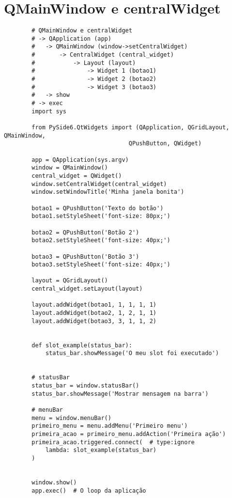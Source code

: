 \documentclass[12pt,a4paper]{article}
\begin{document}
    \section{QMainWindow e centralWidget}
    \begin{lstlisting}
        # QMainWindow e centralWidget
        # -> QApplication (app)
        #   -> QMainWindow (window->setCentralWidget)
        #       -> CentralWidget (central_widget)
        #           -> Layout (layout)
        #               -> Widget 1 (botao1)
        #               -> Widget 2 (botao2)
        #               -> Widget 3 (botao3)
        #   -> show
        # -> exec
        import sys

        from PySide6.QtWidgets import (QApplication, QGridLayout, QMainWindow,
                                    QPushButton, QWidget)

        app = QApplication(sys.argv)
        window = QMainWindow()
        central_widget = QWidget()
        window.setCentralWidget(central_widget)
        window.setWindowTitle('Minha janela bonita')

        botao1 = QPushButton('Texto do botão')
        botao1.setStyleSheet('font-size: 80px;')

        botao2 = QPushButton('Botão 2')
        botao2.setStyleSheet('font-size: 40px;')

        botao3 = QPushButton('Botão 3')
        botao3.setStyleSheet('font-size: 40px;')

        layout = QGridLayout()
        central_widget.setLayout(layout)

        layout.addWidget(botao1, 1, 1, 1, 1)
        layout.addWidget(botao2, 1, 2, 1, 1)
        layout.addWidget(botao3, 3, 1, 1, 2)


        def slot_example(status_bar):
            status_bar.showMessage('O meu slot foi executado')


        # statusBar
        status_bar = window.statusBar()
        status_bar.showMessage('Mostrar mensagem na barra')

        # menuBar
        menu = window.menuBar()
        primeiro_menu = menu.addMenu('Primeiro menu')
        primeira_acao = primeiro_menu.addAction('Primeira ação')
        primeira_acao.triggered.connect(  # type:ignore
            lambda: slot_example(status_bar)
        )


        window.show()
        app.exec()  # O loop da aplicação
    \end{lstlisting}
\end{document}
